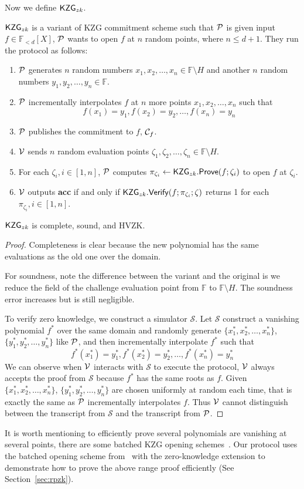 Now we define $\kzgzk$.
\begin{definition}[$\kzgzk$]
$\kzgzk$ is a variant of KZG commitment scheme such that $\mathcal{P}$ is given input $f\in\mathbb{F}_{<d}[X]$, $\mathcal{P}$ wants to open $f$ at $n$ random points, where $n\le{d+1}$. They run the protocol as follows:
\begin{enumerate}
    \item $\mathcal{P}$ generates $n$ random numbers $x_1,x_2,\dots,x_n\in\mathbb{F}\setminus{H}$ and another $n$ random numbers $y_1,y_2,\dots,y_n\in\mathbb{F}$.
    \item $\mathcal{P}$ incrementally interpolates $f$ at $n$ more points $x_1,x_2,\dots,x_n$ such that
    \[ f(x_1)=y_1,f(x_2)=y_2,\dots,f(x_n)=y_n \]
    \item $\mathcal{P}$ publishes the commitment to $f$, $\mathcal{C}_f$.
    \item $\mathcal{V}$ sends $n$ random evaluation points $\zeta_1,\zeta_2,\dots,\zeta_n\in\mathbb{F}\setminus{H}$.
    \item For each $\zeta_i,i\in[1,n]$, $\mathcal{P}$ computes $\pi_{\zeta_i}\leftarrow\mathsf{KZG}_{zk}.\mathsf{Prove}(f;\zeta_i)$ to open $f$ at $\zeta_i$.
    \item $\mathcal{V}$ outputs \textbf{acc} if and only if $\mathsf{KZG}_{zk}.\mathsf{Verify}(f;\pi_{\zeta_i};\zeta)$ returns 1 for each $\pi_{\zeta_i},i\in[1,n]$.
\end{enumerate}
\end{definition}

\begin{theorem}
\label{thm:kzgzk}
$\kzgzk$ is complete, sound, and HVZK.
\end{theorem}
\begin{proof}
Completeness is clear because the new polynomial has the same evaluations as the old one over the domain.

For soundness, note the difference between the variant and the original is we reduce the field of the challenge evaluation point from $\mathbb{F}$ to $\mathbb{F}\setminus{H}$. The soundness error increases but is still negligible.

To verify zero knowledge, we construct a simulator $\mathcal{S}$. Let $\mathcal{S}$ construct a vanishing polynomial $f^*$ over the same domain and randomly generate $\{x_1^*,x_2^*,\dots,x_n^*\}$, $\{y_1^*,y_2^*,\dots,y_n^*\}$ like $\mathcal{P}$, and then incrementally interpolate $f^*$ such that
\[ f^*(x_1^*)=y_1^*,f^*(x_2^*)=y_2^*,\dots,f^*(x_n^*)=y_n^* \]
We can observe when $\mathcal{V}$ interacts with $\mathcal{S}$ to execute the protocol, $\mathcal{V}$ always accepts the proof from $\mathcal{S}$ because $f^*$ has the same roots as $f$. Given $\{x_1^*,x_2^*,\dots,x_n^*\}$, $\{y_1^*,y_2^*,\dots,y_n^*\}$ are chosen uniformly at random each time, that is exactly the same as $\mathcal{P}$ incrementally interpolates $f$. Thus $\mathcal{V}$ cannot distinguish between the transcript from $\mathcal{S}$ and the transcript from $\mathcal{P}$.
\end{proof}
It is worth mentioning to efficiently prove several polynomials are vanishing at several points, there are some batched KZG opening schemes~\cite{plonk,bdfg,fflonk}. Our protocol uses the batched opening scheme from~\cite{plonk} with the zero-knowledge extension to demonstrate how to prove the above range proof efficiently (See Section~\ref{sec:rpzk}).

